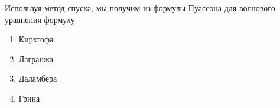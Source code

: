 Используя метод спуска, мы получим из формулы Пуассона для волнового уравнения формулу

\begin{enumerate}[label=\arabic*)]
    \item Кирхгофа
    \item Лагранжа
    \item Даламбера
    \item Грина
\end{enumerate}

